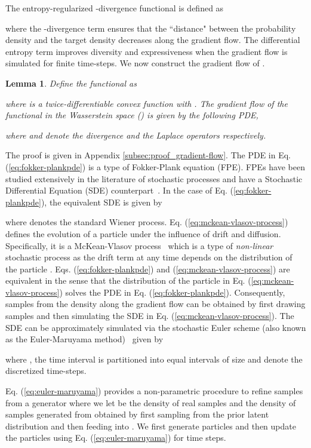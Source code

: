 \documentclass{article} \usepackage{iclr2021_conference,times}
\newtheorem{lemma}[theorem]{Lemma}
\begin{document}
 The entropy-regularized -divergence functional is defined as

where the -divergence term  ensures that the ``distance" between the probability density  and the target density  decreases along the gradient flow. The differential entropy term  improves diversity and expressiveness when the gradient flow is simulated for finite time-steps. We now construct the gradient flow of .
\begin{lemma}
	\label{thm:gradient-flow}
	Define the functional  as
	
	where  is a twice-differentiable convex function with . The gradient flow of the functional  in the Wasserstein space () is given by the following PDE,
	
	where  and  denote the divergence and the Laplace operators respectively.
\end{lemma}
The proof is given in Appendix \ref{subsec:proof_gradient-flow}.
The PDE in Eq. (\ref{eq:fokker-plankpde}) is a type of Fokker-Plank equation (FPE). FPEs have been studied extensively in the literature of stochastic processes and have a Stochastic Differential Equation (SDE) counterpart~\citep{risken1996fokker}. In the case of Eq. (\ref{eq:fokker-plankpde}), the equivalent SDE is given by

where  denotes the standard Wiener process. Eq. (\ref{eq:mckean-vlasov-process}) defines the evolution of a particle  under the influence of drift and diffusion. Specifically, it is a McKean-Vlasov process~\citep{braun1977vlasov} which is a type of \emph{non-linear} stochastic process as the drift term at any time  depends on the distribution  of the particle . Eqs. (\ref{eq:fokker-plankpde}) and (\ref{eq:mckean-vlasov-process}) are equivalent in the sense that the distribution of the particle  in Eq. (\ref{eq:mckean-vlasov-process}) solves the PDE in Eq. (\ref{eq:fokker-plankpde}). Consequently, samples from the density  along the gradient flow can be obtained by first drawing samples  and then simulating the SDE in Eq. (\ref{eq:mckean-vlasov-process}). The SDE can be approximately simulated via the stochastic Euler scheme (also known as the Euler-Maruyama method)~\citep{beyn2011numerical} given by

 where , the time interval  is partitioned into equal intervals of size  and  denote the discretized time-steps.

Eq. (\ref{eq:euler-maruyama}) provides a non-parametric procedure to refine samples from a generator  where we let  be the density of real samples and  the density of samples generated from  obtained by first sampling from the prior latent distribution  and then feeding  into . We first generate particles  and then update  the particles using Eq. (\ref{eq:euler-maruyama}) for  time steps.
\end{document}
